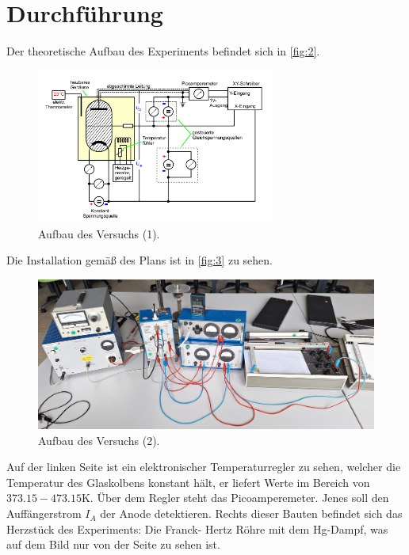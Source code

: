 \section{Durchführung}
\label{sec:Durchführung}

Der theoretische Aufbau des Experiments befindet sich in \autoref{fig:2}.
\begin{figure}[H]
    \centering
        \centering
        \includegraphics[width=0.7\textwidth]{Bilder/theoaufbau.png}
        \caption{Aufbau des Versuchs (1). \cite{anleitung5}}
    \hfill
    \label{fig:2}
\end{figure}
\noindent Die Installation gemäß des Plans ist in \autoref{fig:3} zu sehen.
\begin{figure}[H]
    \centering
        \centering
        \includegraphics[width=\textwidth]{Bilder/installation.jpg}
        \caption{Aufbau des Versuchs (2).}
    \hfill
    \label{fig:3}
\end{figure}
\noindent Auf der linken Seite ist ein elektronischer Temperaturregler zu 
sehen, welcher die Temperatur des Glaskolbens konstant hält, er liefert Werte 
im Bereich von $373.15 - 473.15 \unit{\kelvin}$. Über dem Regler steht das 
Picoamperemeter. Jenes soll den Auffängerstrom $I_A$ der Anode detektieren.
Rechts dieser Bauten befindet sich das Herzstück des Experiments: Die Franck-
Hertz Röhre mit dem Hg-Dampf, was auf dem Bild nur von der Seite zu sehen ist.
